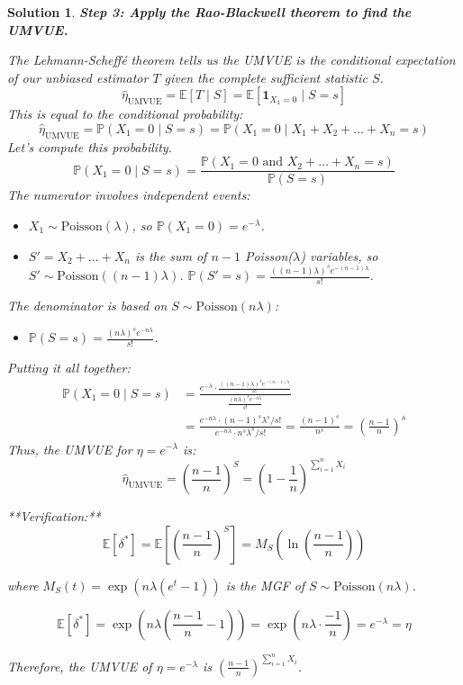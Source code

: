 \documentclass[12pt]{amsart}
\newtheorem*{solution}{Solution}
\begin{document}
\begin{solution}
\textbf{Step 3: Apply the Rao-Blackwell theorem to find the UMVUE.}

The Lehmann-Scheffé theorem tells us the UMVUE is the conditional expectation of our unbiased estimator $T$ given the complete sufficient statistic $S$.
$$\hat{\eta}_{\text{UMVUE}} = \mathbb{E}[T \mid S] = \mathbb{E}[\mathbf{1}_{X_1 = 0} \mid S=s]$$
This is equal to the conditional probability:
$$\hat{\eta}_{\text{UMVUE}} = \mathbb{P}(X_1 = 0 \mid S = s) = \mathbb{P}(X_1 = 0 \mid X_1 + X_2 + \dots + X_n = s)$$
Let's compute this probability.
$$\mathbb{P}(X_1 = 0 \mid S = s) = \frac{\mathbb{P}(X_1 = 0 \text{ and } X_2 + \dots + X_n = s)}{\mathbb{P}(S=s)}$$
The numerator involves independent events:
\begin{itemize}
    \item $X_1 \sim \text{Poisson}(\lambda)$, so $\mathbb{P}(X_1=0) = e^{-\lambda}$.
    \item $S' = X_2 + \dots + X_n$ is the sum of $n-1$ Poisson($\lambda$) variables, so $S' \sim \text{Poisson}((n-1)\lambda)$.
    $\mathbb{P}(S'=s) = \frac{((n-1)\lambda)^s e^{-(n-1)\lambda}}{s!}$.
\end{itemize}
The denominator is based on $S \sim \text{Poisson}(n\lambda)$:
\begin{itemize}
    \item $\mathbb{P}(S=s) = \frac{(n\lambda)^s e^{-n\lambda}}{s!}$.
\end{itemize}
Putting it all together:
\begin{align*}
\mathbb{P}(X_1 = 0 \mid S = s) &= \frac{e^{-\lambda} \cdot \frac{((n-1)\lambda)^s e^{-(n-1)\lambda}}{s!}}{\frac{(n\lambda)^s e^{-n\lambda}}{s!}} \\
&= \frac{e^{-n\lambda} \cdot (n-1)^s \lambda^s / s!}{e^{-n\lambda} \cdot n^s \lambda^s / s!} = \frac{(n-1)^s}{n^s} = \left(\frac{n-1}{n}\right)^s
\end{align*}
Thus, the UMVUE for $\eta=e^{-\lambda}$ is:
$$\hat{\eta}_{\text{UMVUE}} = \left(\frac{n-1}{n}\right)^S = \left(1 - \frac{1}{n}\right)^{\sum_{i=1}^n X_i}$$

**Verification:**
$$\mathbb{E}[\delta^*] = \mathbb{E}\left[\left(\frac{n-1}{n}\right)^S\right] = M_S\left(\ln\left(\frac{n-1}{n}\right)\right)$$

where $M_S(t) = \exp(n\lambda(e^t - 1))$ is the MGF of $S \sim \text{Poisson}(n\lambda)$.

$$\mathbb{E}[\delta^*] = \exp\left(n\lambda\left(\frac{n-1}{n} - 1\right)\right) = \exp\left(n\lambda \cdot \frac{-1}{n}\right) = e^{-\lambda} = \eta$$

Therefore, the UMVUE of $\eta = e^{-\lambda}$ is $\left(\frac{n-1}{n}\right)^{\sum_{i=1}^n X_i}$.
\end{solution}
\end{document}
